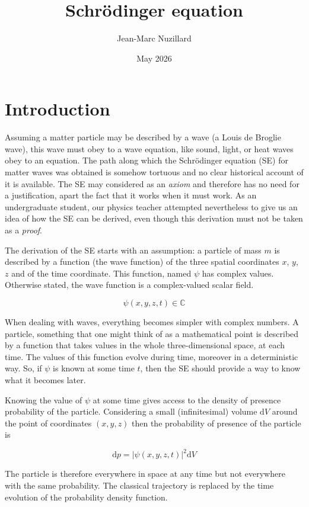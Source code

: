 \documentclass{article}
\title{Schr\"odinger equation}
\author{Jean-Marc Nuzillard}
\date{May 2026}
\begin{document}
\maketitle

\section{Introduction}
Assuming a matter particle may be described by a wave (a Louis de Broglie wave), this wave must 
obey to a wave equation, like sound, light, or heat waves obey to an equation.
The path along which the Schr\"{o}dinger equation (SE) for matter waves
was obtained is somehow tortuous and no clear historical account of it is available.
The SE may considered as an {\em axiom} and therefore has no need for a justification,
apart the fact that it works when it must work.
As an undergraduate student, our physics teacher attempted nevertheless to give us an idea of how the SE can be derived,
even though this derivation must not be taken as a {\em proof}.

The derivation of the SE starts with an assumption: a particle of mass $m$ is described by
a function (the wave function) of the three spatial coordinates $x$, $y$, $z$
and of the time coordinate. This function, named $\psi$ has complex values.
Otherwise stated, the wave function is a complex-valued scalar field.

\[
\psi(x, y, z, t) \in \mathbb{C}
\]

When dealing with waves, everything becomes simpler with complex numbers.
A particle, something that one might think of as a mathematical point 
is described by a function that takes values in the whole three-dimensional space, at each time.
The values of this function evolve during time, moreover in a deterministic way.
So, if $\psi$ is known at some time $t$, then the SE should provide a way 
to know what it becomes later.

Knowing the value of $\psi$ at some time gives access to the density of presence probability of the particle.
Considering a small (infinitesimal) volume $\mathrm{d}V$ around the point of coordinates $(x, y, z)$ then
the probability of presence of the particle is

\[
\mathrm{d}p = |\psi(x,y,z,t)|^2 \mathrm{d}V
\]

The particle is therefore everywhere in space at any time but not everywhere with the same probability.
The classical trajectory is replaced by the time evolution of the probability density function.
\end{document}
